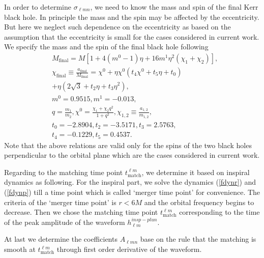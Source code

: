 \documentclass[prd,aps,a4paper,superscriptaddress,twocolumn,footinbib,showpacs]{revtex4}
\begin{document}
In order to determine $\sigma_{\ell m n}$, we need to know the mass and spin of the final Kerr black hole. In principle the mass and the spin may be affected by the eccentricity. But here we neglect such dependence on the eccentricity as \cite{PhysRevD.95.024038} based on the assumption that the eccentricity is small for the cases considered in current work. We specify the mass and the spin of the final black hole following \cite{barausse2009predicting,PhysRevD.78.081501}
\begin{align}
&M_{\text{final}}=M[1+4(m^0-1)\eta+16m^1\eta^2(\chi_1+\chi_2)],\label{finalmass}\\
&\chi_{\text{final}}\equiv\frac{a_{\text{final}}}{M_{\text{final}}}=\chi^0+\eta\chi^0(t_4\chi^0+t_5\eta+t_0)\nonumber\\
&+\eta(2\sqrt{3}+t_2\eta+t_3\eta^2),\label{finalspin}\\
&m^0=0.9515,m^1=-0.013,\nonumber\\
&q=\frac{m_1}{m_2},\chi^0=\frac{\chi_1+\chi_2q^2}{1+q^2},\chi_{1,2}\equiv\frac{a_{1,2}}{m_{1,2}},\nonumber\\
&t_0=-2.8904,t_2=-3.5171,t_3=2.5763,\nonumber\\
&t_4=-0.1229,t_5=0.4537.\nonumber
\end{align}
Note that the above relations are valid only for the spins of the two black holes perpendicular to the orbital plane which are the cases considered in current work.

Regarding to the matching time point $t^{\ell m}_{\text{match}}$, we determine it based on inspiral dynamics as following. For the inspiral part, we solve the dynamics (\ref{fdynr}) and (\ref{fdynp}) till a time point which is called `merger time point' for convenience. The criteria of the `merger time point' is $r<6M$ and the orbital frequency begins to decrease. Then we chose the matching time point $t^{\ell m}_{\text{match}}$ corresponding to the time of the peak amplitude of the waveform $h^{insp-plun}_{\ell m}$.

At last we determine the coefficients $A_{\ell mn}$ base on the rule that the matching is smooth at $t^{\ell m}_{\text{match}}$ through first order derivative of the waveform.
\end{document}
